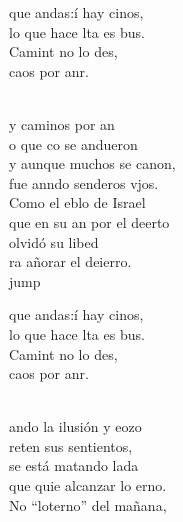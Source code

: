 \begin{cancion}%
	\begin{chorus}%
	 que andas:í hay cinos,  \\
	lo que hace lta es bus.\\
	Camint no lo des,\\
	 caos por anr.\\
	\end{chorus}%
	\jump\\
	y caminos por an \\
	o que co se andueron\\
	y aunque muchos se canon, \\
	fue anndo senderos vjos.\\
	Como el eblo de Israel \\
	que en su an por el deerto\\
	olvidó su libed \\
	ra añorar el deierro.\\jump\\
	\begin{chorus}%
	 que andas:í hay cinos,  \\
	lo que hace lta es bus.\\
	Camint no lo des,\\
	 caos por anr.\\
	\end{chorus}%
	\jump\\
	ando la ilusión y eozo \\
	reten sus sentientos,\\
	se está matando lada\\
	que quie alcanzar lo erno.\\
	No “loterno” del mañana, \\

\end{cancion}

